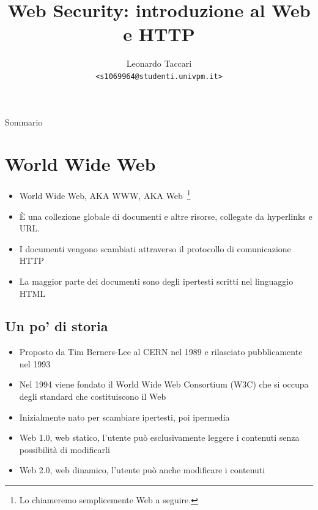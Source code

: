 \documentclass{beamer}
\title{Web Security: introduzione al Web e HTTP}
\author[leot]{Leonardo Taccari \\ {\footnotesize \texttt{<s1069964@studenti.univpm.it>}}}
\date{}
\begin{document}
\begin{frame}
\maketitle
\end{frame}

\begin{frame}{Sommario}
\tableofcontents
\end{frame}

\section{World Wide Web}
\begin{frame}{\insertsection}
\end{frame}

\begin{frame}{\insertsection}
\begin{itemize}
\item \alert{World Wide Web}, AKA \alert{WWW}, AKA \alert{Web}~\footnote{Lo chiameremo
semplicemente Web a seguire.}
\item È una \alert{collezione globale di documenti} e altre risorse, collegate da
\alert{hyperlinks} e \alert{URL}.
\item I documenti vengono scambiati attraverso il protocollo di comunicazione
\alert{HTTP}
\item La maggior parte dei documenti sono degli \alert{ipertesti} scritti nel
linguaggio \alert{HTML}
\end{itemize}
\end{frame}

\subsection*{Un po' di storia}
\begin{frame}{\insertsection}{\insertsubsection}
\begin{itemize}
\item Proposto da Tim Berners-Lee al CERN nel 1989 e rilasciato pubblicamente nel 1993
\item Nel 1994 viene fondato il World Wide Web Consortium (W3C) che si occupa
degli standard che costituiscono il Web
\item Inizialmente nato per scambiare \alert{ipertesti}, poi \alert{ipermedia}
\item \alert{Web 1.0}, \alert{web statico}, l'utente può esclusivamente leggere i
contenuti senza possibilità di modificarli
\item \alert{Web 2.0}, \alert{web dinamico}, l'utente può anche modificare i
contenuti
\end{itemize}
\end{frame}
\end{document}
